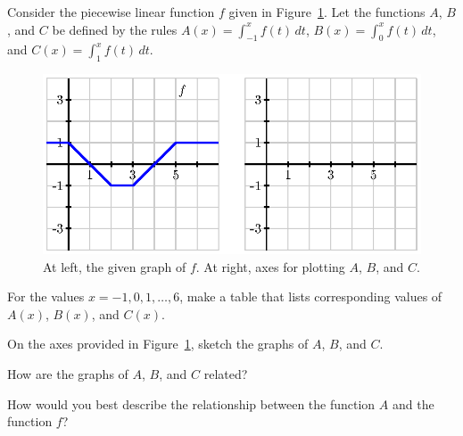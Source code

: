\begin{exercises}
  \item Consider the piecewise linear function $f$ given in Figure~\ref{F:5.1.Ez3}.  Let the functions $A$, $B$, and $C$ be defined by the rules $A(x) = \int_{-1}^{x} f(t) \, dt$, $B(x) = \int_{0}^{x} f(t) \, dt$, and $C(x) = \int_{1}^{x} f(t) \, dt$.
  \begin{figure}[h]
\begin{center}
\includegraphics{figures/5_1_Ez3.eps}
\caption{At left, the given graph of $f$.  At right, axes for plotting $A$, $B$, and $C$.} \label{F:5.1.Ez3}
\end{center}
\end{figure}
	\ba
		\item For the values $x = -1, 0, 1, \ldots, 6$, make a table that lists corresponding values of $A(x)$, $B(x)$, and $C(x)$.  
		\item On the axes provided in Figure~\ref{F:5.1.Ez3}, sketch the graphs of $A$, $B$, and $C$.
		\item How are the graphs of $A$, $B$, and $C$ related?
		\item How would you best describe the relationship between the function $A$ and the function $f$?
	\ea
	
\vfill \ 


\end{exercises}
\afterexercises
